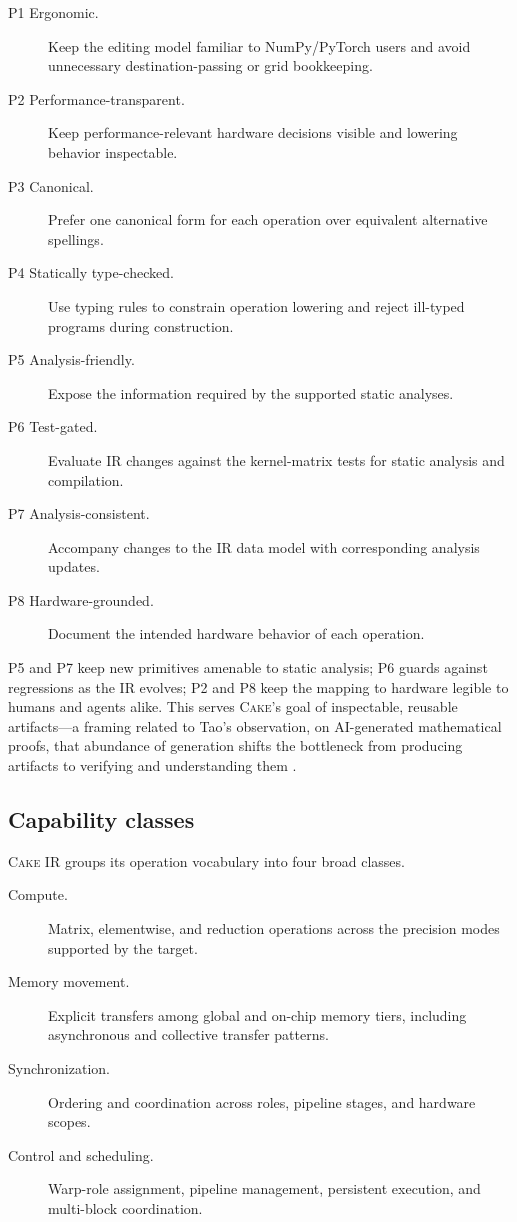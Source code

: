 \documentclass[11pt]{article}
\newcommand{\cake}{\textsc{Cake}}
\newcommand{\cakeir}{\textsc{Cake IR}}
\begin{document}
\begin{description}
  \item[P1 Ergonomic.] Keep the editing model familiar to NumPy/PyTorch users
  and avoid unnecessary destination-passing or grid bookkeeping.
  \item[P2 Performance-transparent.] Keep performance-relevant hardware
  decisions visible and lowering behavior inspectable.
  \item[P3 Canonical.] Prefer one canonical form for each operation over
  equivalent alternative spellings.
  \item[P4 Statically type-checked.] Use typing rules to constrain operation
  lowering and reject ill-typed programs during construction.
  \item[P5 Analysis-friendly.] Expose the information required by the supported
  static analyses.
  \item[P6 Test-gated.] Evaluate IR changes against the kernel-matrix tests for
  static analysis and compilation.
  \item[P7 Analysis-consistent.] Accompany changes to the IR data model with
  corresponding analysis updates.
  \item[P8 Hardware-grounded.] Document the intended hardware behavior of each
  operation.
\end{description}

P5 and P7 keep new primitives amenable to static analysis; P6 guards against
regressions as the IR evolves; P2 and P8 keep the mapping to hardware legible to
humans and agents alike. This serves \cake{}'s goal of inspectable, reusable
artifacts---a framing related to Tao's observation, on AI-generated
mathematical proofs, that
abundance of generation shifts the bottleneck from producing artifacts to
verifying and understanding them \cite{tao2026digestion}.

\subsection{Capability classes}

\cakeir{} groups its operation vocabulary into four broad classes.

\begin{description}
  \item[Compute.] Matrix, elementwise, and reduction operations across the
  precision modes supported by the target.
  \item[Memory movement.] Explicit transfers among global and on-chip memory
  tiers, including asynchronous and collective transfer patterns.
  \item[Synchronization.] Ordering and coordination across roles, pipeline
  stages, and hardware scopes.
  \item[Control and scheduling.] Warp-role assignment, pipeline management,
  persistent execution, and multi-block coordination.
\end{description}
\end{document}
